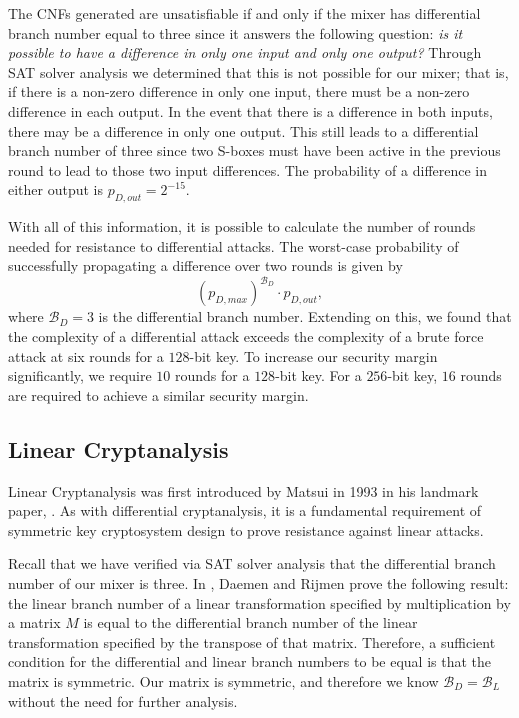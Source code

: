 The CNFs generated are unsatisfiable if and only if the mixer has differential branch number equal to three since it answers the following question: \emph{is it possible to have a difference in only one input and only one output?}
Through SAT solver analysis we determined that this is not possible for our mixer; that is, if there is a non-zero difference in only one input, there must be a non-zero difference in each output.
In the event that there is a difference in both inputs, there may be a difference in only one output.
This still leads to a differential branch number of three since two S-boxes must have been active in the previous round to lead to those two input differences.
The probability of a difference in either output is $p_{D,out} = 2^{-15}$.

With all of this information, it is possible to calculate the number of rounds needed for resistance to differential attacks.
The worst-case probability of successfully propagating a difference over two rounds is given by
\begin{equation*}
(p_{D,max})^{\mathcal{B}_D} \cdot p_{D,out},
\end{equation*}
where $\mathcal{B}_D = 3$ is the differential branch number.
Extending on this, we found that the complexity of a differential attack exceeds the complexity of a brute force attack at six rounds for a $128$-bit key.
To increase our security margin significantly, we require $10$ rounds for a $128$-bit key. 
For a $256$-bit key, $16$ rounds are required to achieve a similar security margin.

\subsection{Linear Cryptanalysis}
Linear Cryptanalysis was first introduced by Matsui in 1993 in his landmark paper, \cite{Matsui1993_Linear}.
As with differential cryptanalysis, it is a fundamental requirement of symmetric key cryptosystem design to prove resistance against linear attacks.

Recall that we have verified via SAT solver analysis that the differential branch number of our mixer is three.
In \cite{Daemen2002_DesignOfRijndael}, Daemen and Rijmen prove the following result: the linear branch number of a linear transformation specified by multiplication by a matrix $M$ is equal to the differential branch number of the linear transformation specified by the transpose of that matrix.
Therefore, a sufficient condition for the differential and linear branch numbers to be equal is that the matrix is symmetric.
Our matrix is symmetric, and therefore we know $\mathcal{B}_D = \mathcal{B}_L$ without the need for further analysis.

